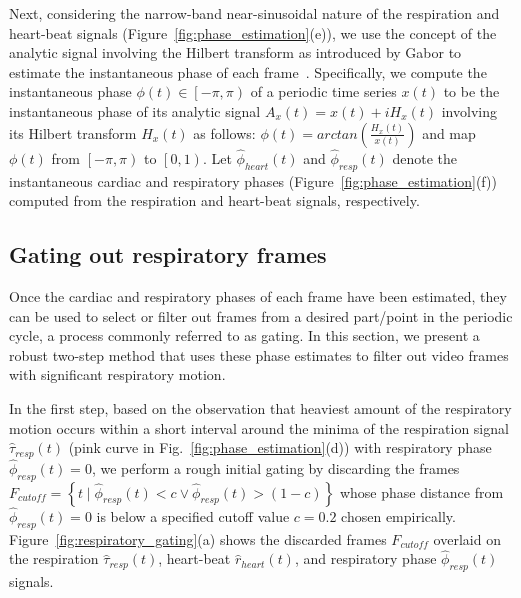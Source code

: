 \documentclass[journal]{IEEEtran}
\begin{document}
Next, considering the narrow-band near-sinusoidal nature of the respiration and heart-beat signals (Figure~\ref{fig:phase_estimation}(e)), we use the concept of the analytic signal involving the Hilbert transform as introduced by Gabor to estimate the instantaneous phase of each frame~\cite{Gabor1946,Bracewell1986,Rosenblum2001,Freund2003}. Specifically, we compute the instantaneous phase $\phi(t) \in \left [  -\pi, \pi\right )$ of a periodic time series $x(t)$ to be the instantaneous phase of its analytic signal $A_x(t) = x(t) + i H_x(t)$ involving its Hilbert transform $H_x(t)$ as follows: $\phi(t) = arctan \left( \frac{H_x(t)}{x(t)}\right)$ and map $\phi(t)$ from $\left [  -\pi, \pi\right )$ to $\left [  0, 1\right )$. Let $\hat{\phi}_{heart}(t)$ and $\hat{\phi}_{resp}(t)$ denote the instantaneous cardiac and respiratory phases (Figure~\ref{fig:phase_estimation}(f)) computed from the respiration and heart-beat signals, respectively.
%
\vspace{-0.3cm}
\subsection{Gating out respiratory frames}
\label{sec:method:gating}
%
Once the cardiac and respiratory phases of each frame have been estimated, they can be used to select or filter out frames from a desired part/point in the periodic cycle, a process commonly referred to as gating. In this section, we present a robust two-step method that uses these phase estimates to filter out video frames with significant respiratory motion.

In the first step, based on the observation that heaviest amount of the respiratory motion occurs within a short interval around the minima of the respiration signal $\hat{\tau}_{resp}(t)$ (pink curve in Fig.~\ref{fig:phase_estimation}(d)) with respiratory phase $\hat{\phi}_{resp}(t) = 0$, we perform a rough initial gating by discarding the frames $F_{cutoff} = \left \{ t \mid \hat{\phi}_{resp}(t) < c \vee \hat{\phi}_{resp}(t) > (1 - c) \right \}$ whose phase distance from $\hat{\phi}_{resp}(t) = 0$ is below a specified cutoff value $c=0.2$ chosen empirically. Figure~\ref{fig:respiratory_gating}(a) shows the discarded frames $F_{cutoff}$ overlaid on the respiration $\hat{\tau}_{resp}(t)$, heart-beat  $\hat{r}_{heart}(t)$, and respiratory phase $\hat{\phi}_{resp}(t)$ signals.
\end{document}
